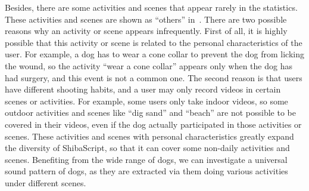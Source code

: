         

Besides, there are some activities and scenes that appear rarely in the statistics. 
These activities and scenes are shown as ``others'' in~. There are two possible reasons why an activity or scene appears infrequently. First of all, it is highly possible that this activity or scene is related to the personal characteristics of the user. For example, a dog has to wear a cone collar to prevent the dog from licking the wound, so the activity ``wear a cone collar'' appears only when the dog has had surgery, and this event is not a common one. The second reason is that users have different shooting habits, and a user may only record videos in certain scenes or activities. For example, some users only take indoor videos, so some outdoor activities and scenes like ``dig sand'' and ``beach'' are not possible to be covered in their videos, even if the dog actually participated in those activities or scenes. These activities and scenes with personal characteristics greatly expand the diversity of ShibaScript, so that it can cover some non-daily activities and scenes. Benefiting from the wide range of dogs, we can investigate a universal sound pattern of dogs, as they are extracted via them doing various activities under different scenes.


